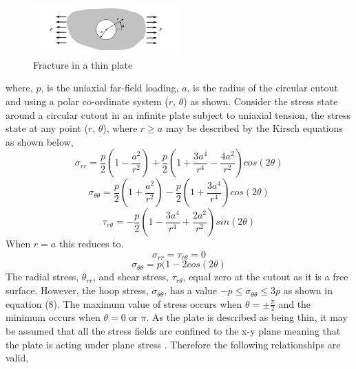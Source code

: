 \documentclass[11pt,twocolumn]{article} %
\begin{document}
\begin{figure}[!ht]
	\centering
		\includegraphics[width=0.5\textwidth]{Fracture.png}
	\caption{Fracture in a thin plate}
\end{figure}
\linebreak
where, $p$, is the uniaxial far-field loading, $a$, is the radius of the circular cutout and using a polar co-ordinate system ($r$, $\theta$) as shown. \linebreak Consider the stress state around a circular cutout in an infinite plate subject to uniaxial tension, the stress state at any point ($r$, $\theta$), where $r \geq a$ may be described by the Kirsch equations \cite{Kirch} as shown below, 
\begin{equation} %
	\sigma_{rr} = \frac{p}{2}(1-\frac{a^2}{r^2})+\frac{p}{2}(1+\frac{3a^4}{r^4}-\frac{4a^2}{r^2})cos(2\theta)
\end{equation}
\begin{equation} %
	\sigma_{\theta\theta} = \frac{p}{2}(1+\frac{a^2}{r^2})-\frac{p}{2}(1+\frac{3a^4}{r^4})cos(2\theta)
\end{equation}
\begin{equation} %
	\tau_{r\theta} = -\frac{p}{2}(1-\frac{3a^4}{r^4}+\frac{2a^2}{r^2})sin(2\theta)
\end{equation}
When $r = a$ this reduces to.
\begin{equation} %
	\sigma_{rr} = \tau_{r\theta} = 0
\end{equation}
\begin{equation} %
	\sigma_{\theta\theta} = p(1-2cos(2\theta)
\end{equation}
The radial stress, $\theta_{rr}$, and shear stress, $\tau_{r\theta}$, equal zero at the cutout as it is a free surface. However, the hoop stress, $\sigma_{\theta\theta}$, 
has a value $-p \leq \sigma_{\theta\theta} \leq 3p$ as shown in equation (8). The maximum value of stress occurs when $\theta = \pm\frac{\pi}{2}$ and the minimum occurs when $\theta = 0$ or $\pi$. As the plate is described as being thin, it may be assumed that all the stress fields are confined to the x-y plane meaning that the plate is acting under plane  stress \cite{planestress}. Therefore the following relationships are valid,
\end{document}
